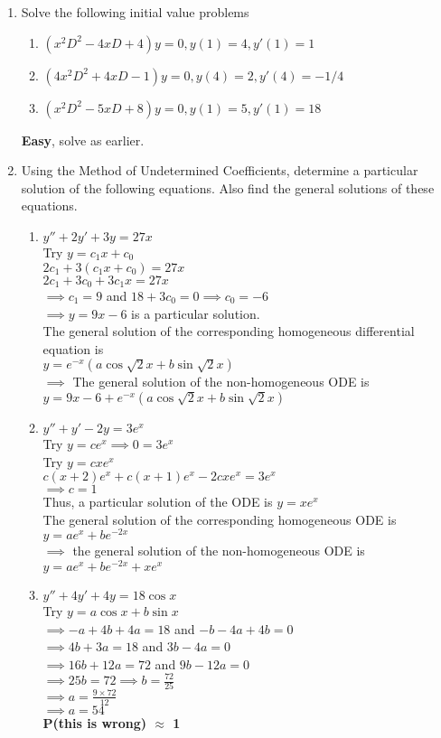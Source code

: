\documentclass[a4paper]{article}
\begin{document}
\begin{enumerate}
\begin{enumerate}
	\end{enumerate}

	\item Solve the following initial value problems
	\begin{enumerate}
		\item $(x^2D^2-4xD+4)y=0, y(1)=4, y'(1)=1$
		\item $(4x^2D^2+4xD-1)y=0, y(4)=2, y'(4)=-1/4$
		\item $(x^2D^2-5xD+8)y=0,y(1)=5,y'(1)=18$
	\end{enumerate}
	\textbf{Easy}, solve as earlier.
	
	\item Using the Method of Undetermined Coefficients, determine a particular solution of the following equations. Also find the general solutions of these equations.
	\begin{enumerate}
		\item $y''+2y'+3y=27x$\\
		Try $y=c_1x+c_0$\\
		$2c_1+3(c_1x+c_0)=27x$\\
		$2c_1+3c_0+3c_1x=27x$\\
		$\implies c_1=9$ and $18+3c_0=0 \implies c_0=-6$\\
		$\implies y=9x-6$ is a particular solution.\\
		The general solution of the corresponding homogeneous differential equation is\\
		$y=e^{-x}(a\cos\sqrt{2}x + b\sin\sqrt{2}x)$\\
		$\implies$ The general solution of the non-homogeneous ODE is \\
		$y=9x-6 + e^{-x}(a\cos\sqrt{2}x + b\sin\sqrt{2}x)$
				
		\item $y''+y'-2y=3e^x$\\
		Try $y=ce^x\implies 0=3e^x$\\
        Try $y=cxe^{x}$\\
        $c(x+2)e^x+c(x+1)e^x-2cxe^x=3e^x$\\
        $\implies c=1$\\
        Thus, a particular solution of the ODE is $y=xe^x$\\
        The general solution of the corresponding homogeneous ODE is $y=ae^x+be^{-2x}$\\
        $\implies$ the general solution of the non-homogeneous ODE is $y=ae^x+be^{-2x} +xe^x$
        
		\item $y''+4y'+4y=18\cos x$\\
		Try $y=a\cos x +b\sin x$\\
		$\implies -a+4b+4a=18$ and $-b-4a+4b=0$\\
		$\implies 4b+3a=18$ and $3b-4a=0$\\
		$\implies 16b+12a=72$ and $9b-12a=0$\\
		$\implies 25b=72 \implies b=\frac{72}{25}$\\
		$\implies a=\frac{9\times 72}{12}$\\
		$\implies a=54$\\
		\textbf{P(this is wrong) $\approx$ 1}


\end{enumerate}
\end{enumerate}
\end{document}
